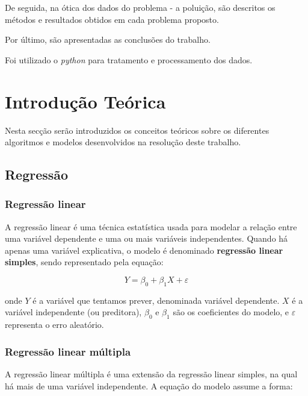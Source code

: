 \documentclass[conference]{IEEEtran}
\begin{document}
De seguida, na ótica dos dados do problema - a poluição, são descritos os métodos e resultados obtidos em cada problema proposto. 

Por último, são apresentadas as conclusões do  trabalho.

Foi utilizado o \textit{python} para tratamento e processamento dos dados.

\section{Introdução Teórica}

Nesta secção serão introduzidos os conceitos teóricos sobre os diferentes algoritmos e modelos desenvolvidos na resolução deste trabalho. 

\subsection{Regressão}

\subsubsection{Regressão linear}


A regressão linear é uma técnica estatística usada para modelar a relação entre uma variável dependente e uma ou mais variáveis independentes. Quando há apenas uma variável explicativa, o modelo é denominado \textbf{regressão linear simples}, sendo representado pela equação:

\begin{equation}
	Y = \beta_0 + \beta_1 X + \varepsilon
\end{equation}

onde \( Y \) é a variável que tentamos prever, denominada variável dependente. \( X \) é a variável independente (ou preditora), \( \beta_0 \) e \( \beta_1 \) são os coeficientes do modelo, e \( \varepsilon \) representa o erro aleatório. \cite{madureira2024aed}

\subsubsection{Regressão linear múltipla}
A regressão linear múltipla é uma extensão da regressão linear simples, na qual há mais de uma variável independente. A equação do modelo assume a forma:
\end{document}
